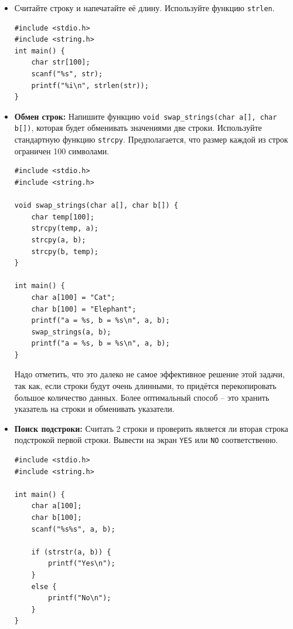 \documentclass{article}
\begin{document}
\begin{itemize}
\item Считайте строку и напечатайте её длину. Используйте функцию \texttt{strlen}.

\begin{lstlisting}[backgroundcolor = \color{solcolor}]
#include <stdio.h>
#include <string.h>
int main() {
    char str[100];
    scanf("%s", str);
    printf("%i\n", strlen(str));
}
\end{lstlisting}

\newpage
\item \textbf{Обмен строк:} Напишите функцию \texttt{void swap\_strings(char a[], char b[])}, которая будет обменивать значениями две строки. Используйте стандартную функцию \texttt{strcpy}. Предполагается, что размер каждой из строк ограничен 100 символами.

\begin{lstlisting}[backgroundcolor = \color{solcolor}]
#include <stdio.h>
#include <string.h>

void swap_strings(char a[], char b[]) {
    char temp[100];
    strcpy(temp, a);
    strcpy(a, b);
    strcpy(b, temp);
}

int main() {
    char a[100] = "Cat";
    char b[100] = "Elephant";
    printf("a = %s, b = %s\n", a, b);
    swap_strings(a, b);
    printf("a = %s, b = %s\n", a, b);
}
\end{lstlisting}
Надо отметить, что это далеко не самое эффективное решение этой задачи, так как, если строки будут очень длинными, то придётся перекопировать большое количество данных. Более оптимальный способ -- это хранить указатель на строки и обменивать указатели.
\item \textbf{Поиск подстроки:} Считать 2 строки и проверить является ли вторая строка подстрокой первой строки. Вывести на экран \texttt{YES} или \texttt{NO} соответственно.
\begin{lstlisting}[backgroundcolor = \color{solcolor}]
#include <stdio.h>
#include <string.h>

int main() {
    char a[100];
    char b[100];
    scanf("%s%s", a, b);
    
    if (strstr(a, b)) {
        printf("Yes\n");
    }
    else {
        printf("No\n");
    }
}

\end{lstlisting}
\end{itemize}

\newpage
\end{document}
